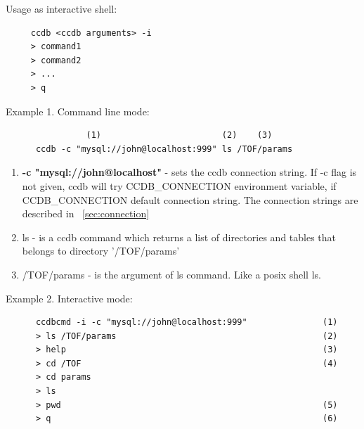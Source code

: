 \documentclass{article}
\begin{document}
Usage as interactive shell:
\begin{verbatim}
     ccdb <ccdb arguments> -i
     > command1
     > command2
     > ...
     > q
\end{verbatim}
\vspace{1 em}


Example 1. Command line mode:
\begin{verbatim}
                (1)                        (2)    (3)
      ccdb -c "mysql://john@localhost:999" ls /TOF/params

\end{verbatim}
\vspace{1 em}


\begin{enumerate}
\item \textbf{-c "mysql://john@localhost"} - sets the ccdb connection string.
      If -c flag is not given, ccdb will try CCDB\_CONNECTION environment
      variable, if CCDB\_CONNECTION  default connection string. The connection
      strings are described in ~\ref{sec:connection}

\item ls - is a ccdb command which returns a list of directories and tables
      that belongs to directory '/TOF/params'

\item /TOF/params - is the argument of ls command. Like a posix shell ls.
\end{enumerate}
\vspace{1 em}


Example 2. Interactive mode:
\begin{verbatim}
      ccdbcmd -i -c "mysql://john@localhost:999"               (1)
      > ls /TOF/params                                         (2)
      > help                                                   (3)
      > cd /TOF                                                (4)
      > cd params
      > ls
      > pwd                                                    (5)
      > q                                                      (6)
\end{verbatim}
\end{document}
